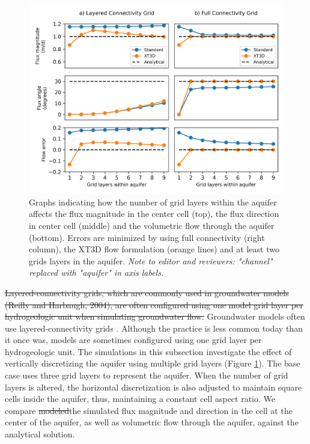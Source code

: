 \documentclass{article}
\begin{document}
\begin{figure}
	\begin{center}
	\includegraphics[scale=0.9]{../figures/fig3paper.png}
	\caption{Graphs indicating how the number of grid layers within the aquifer affects the flux magnitude in the center cell (top), the flux direction in center cell (middle) and the volumetric flow through the aquifer (bottom). Errors are minimized by using full connectivity (right column), the XT3D flow formulation (orange lines) and at least two grids layers in the aquifer. {\color{red} \textit{Note to editor and reviewers: "channel" replaced with "aquifer" in axis labels.}}}
	\label{fig:fig3}
	\end{center}
\end{figure}

{\color{red} \sout{Layered-connectivity grids, which are commonly used in groundwater models (Reilly and Harbaugh, 2004), are often configured using one model grid layer per hydrogeologic unit when simulating groundwater flow.}
Groundwater models often use layered-connectivity grids \citep{Reilly2004}. Although the practice is less common today than it once was, models are sometimes configured using one grid layer per hydrogeologic unit.} The simulations in this subsection investigate the effect of vertically discretizing the aquifer using multiple grid layers (Figure \ref{fig:fig3}). The base case uses three grid layers to represent the aquifer. When the number of grid layers is altered, the horizontal discretization is also adjusted to maintain square cells inside the aquifer, thus, maintaining a constant cell aspect ratio. We compare {\color{red} \sout{modeled}the simulated} flux magnitude and direction in {\color{red} the} cell at the center of the aquifer, as well as volumetric flow through the aquifer, against the analytical solution.
\end{document}
